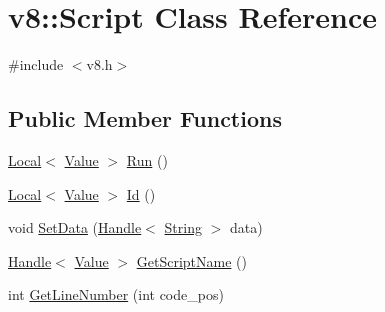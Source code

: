 \hypertarget{classv8_1_1_script}{}\section{v8\+:\+:Script Class Reference}
\label{classv8_1_1_script}


{\ttfamily \#include $<$v8.\+h$>$}

\subsection*{Public Member Functions}
\begin{DoxyCompactItemize}
\item 
\hyperlink{classv8_1_1_local}{Local}$<$ \hyperlink{classv8_1_1_value}{Value} $>$ \hyperlink{classv8_1_1_script_a5f43b29d40bd51ebad2cc275ba3898a1}{Run} ()
\item 
\hyperlink{classv8_1_1_local}{Local}$<$ \hyperlink{classv8_1_1_value}{Value} $>$ \hyperlink{classv8_1_1_script_aa25adfbb98af9179b4891e09432c2916}{Id} ()
\item 
void \hyperlink{classv8_1_1_script_a048fa4168b809ca73cc435e341e41b0b}{Set\+Data} (\hyperlink{classv8_1_1_handle}{Handle}$<$ \hyperlink{classv8_1_1_string}{String} $>$ data)
\item 
\hyperlink{classv8_1_1_handle}{Handle}$<$ \hyperlink{classv8_1_1_value}{Value} $>$ \hyperlink{classv8_1_1_script_af8ce37d0733b79046e8ccb76baa5d0d9}{Get\+Script\+Name} ()
\item 
int \hyperlink{classv8_1_1_script_a5cb7ed6fe0046a5b66c8810ab4a09876}{Get\+Line\+Number} (int code\+\_\+pos)
\end{DoxyCompactItemize}
